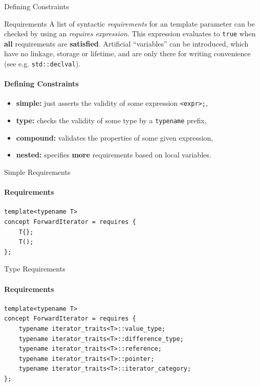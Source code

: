 \documentclass{beamer}
\begin{document}
    \begin{frame}[fragile]{Defining Constraints}
    \end{frame}

    \begin{frame}[fragile]{Requirements}
        A list of syntactic \emph{requirements} for an template parameter can be checked by using an \emph{requires expression}. This expression evaluates to \texttt{true} when \textbf{all} requirements are \textbf{satisfied}. Artificial ``variables'' can be introduced, which have no linkage, storage or lifetime, and are only there for writing convenience (see e.g. \texttt{std::declval}).
        \framesubtitle{Defining Constraints}
        \begin{itemize}
        \item{\textbf{simple:} just asserts the validity of some expression \texttt{<expr>;},}
        \item{\textbf{type:} checks the validity of some type by a \texttt{typename} prefix,}
        \item{\textbf{compound:} validates the properties of some given expression,}
        \item{\textbf{nested:} specifies \textbf{more} requirements based on local variables.}
        \end{itemize}
    \end{frame}

    \begin{frame}[fragile]{Simple Requirements}
        \framesubtitle{Requirements}
        \begin{center}
        \begin{lstlisting}[caption={simple requirements in an incomplete \texttt{ForwardIterator}.}]
template<typename T>
concept ForwardIterator = requires {
    T{};
    T();
};
\end{lstlisting}
        \end{center}
    \end{frame}

    \begin{frame}[fragile]{Type Requirements}
        \framesubtitle{Requirements}
        \begin{center}
        \begin{lstlisting}[caption={type requirements in our incomplete \texttt{ForwardIterator}.}]
template<typename T>
concept ForwardIterator = requires {
    typename iterator_traits<T>::value_type;
    typename iterator_traits<T>::difference_type;
    typename iterator_traits<T>::reference;
    typename iterator_traits<T>::pointer;
    typename iterator_traits<T>::iterator_category;
}; \end{lstlisting}
        \end{center}
    \end{frame}
\end{document}
